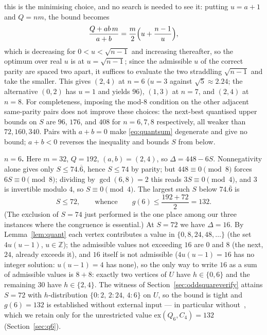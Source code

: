 \documentclass[12pt,a4paper]{article}
\theoremstyle{definition}
\newcommand{\ex}{\mathrm{ex}}
\begin{document}
this is the minimising choice, and no search is needed to see it: putting
$u=a+1$ and $Q=nm$, the bound becomes
\[
\frac{Q+ab\,m}{a+b}=\frac{m}{2}\Bigl(u+\frac{n-1}{u}\Bigr),
\]
which is decreasing for $0<u<\sqrt{n-1}$ and increasing thereafter, so the
optimum over real $u$ is at $u=\sqrt{n-1}$; since the admissible $u$ of the
correct parity are spaced two apart, it suffices to evaluate the two
straddling $\sqrt{n-1}$ and take the smaller. This gives
$(2,4)$ at $n=6$ ($u=3$ against $\sqrt5\approx2.24$; the alternative $(0,2)$
has $u=1$ and yields $96$), $(1,3)$ at $n=7$, and $(2,4)$ at $n=8$.
For completeness, imposing the mod-$8$ condition on the other adjacent
same-parity pairs does not improve these choices: the next-best quantised
upper bounds on $S$ are $96$, $176$, and $408$ for $n=6,7,8$ respectively,
all weaker than $72,160,340$. Pairs with
$a+b=0$ make \eqref{eq:quantsum} degenerate and give no bound; $a+b<0$
reverses the inequality and bounds $S$ from below.

\textbf{$n=6$.} Here $m=32$, $Q=192$, $(a,b)=(2,4)$, so
$\Delta=448-6S$. Nonnegativity alone gives only
$S\le74.\overline{6}$, hence $S\le74$ by parity; but
$448\equiv0\pmod 8$ forces $6S\equiv0\pmod8$; dividing by
$\gcd(6,8)=2$ this reads $3S\equiv0\pmod4$, and $3$ is invertible
modulo $4$, so $S\equiv0\pmod4$.
The largest such $S$ below $74.\overline{6}$ is
\[
S\le72,
\qquad\text{whence}\qquad
g(6)\le\frac{192+72}{2}=132 .
\]
(The exclusion of $S=74$ just performed is the one place among our three
instances where the congruence is essential.) At $S=72$ we have $\Delta=16$. By Lemma~\ref{lem:quant} each vertex
contributes a value in $\{0,8,24,48,\ldots\}$ (the set $4u(u-1)$,
$u\in\mathbb{Z}$); the admissible values not exceeding $16$ are $0$ and
$8$ (the next, $24$, already exceeds it), and $16$ itself is not
admissible ($4u(u-1)=16$ has no integer solution: $u(u-1)=4$ has none),
so the only way to write $16$ as a sum of admissible values
is $8+8$: exactly two vertices of $U$ have $h\in\{0,6\}$ and the
remaining $30$ have $h\in\{2,4\}$. The witness of
Section~\ref{sec:oddsquareverify} attains $S=72$ with $h$-distribution
$\{0{:}2,\,2{:}24,\,4{:}6\}$ on $U$, so the bound is tight and
$g(6)=132$ is established without external input --- in particular
without~\cite{HN94}, which we retain only for the unrestricted value
$\ex(Q_6,C_4)=132$ (Section~\ref{sec:q6}).
\end{document}
